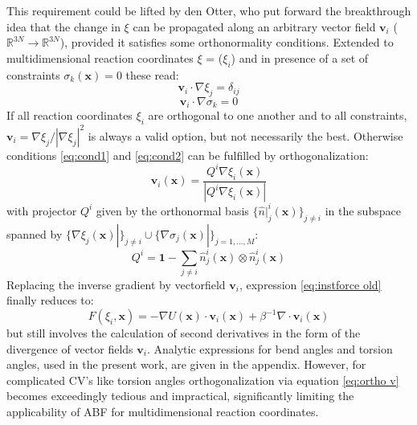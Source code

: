 This requirement could be lifted by den Otter\autocite{den2000thermodynamic}, who put forward the breakthrough idea that the change in $\xi$ can be propagated along an arbitrary vector field $\textbf{v}_i$ ($\mathbb{R}^{3N} \to \mathbb{R}^{3N}$), provided it satisfies some orthonormality conditions.
Extended to multidimensional reaction coordinates \textbf{$\xi$} = ($\xi_i$) and in presence of a set of constraints $\sigma_{k}(\textbf{x})=0$ these read:\autocite{ciccotti2005blue}
\begin{equation}
  \textbf{v}_i \cdot \nabla \xi_j = \delta_{ij} \label{eq:cond1}
\end{equation}
\begin{equation}
  \textbf{v}_i \cdot \nabla \sigma_k = 0 \label{eq:cond2}
\end{equation}
If all reaction coordinates $\xi_i$ are orthogonal to one another and to all constraints, $\textbf{v}_i = \nabla \xi_j/|\nabla \xi_j|^2$ is always a valid option, but not necessarily the best.
Otherwise conditions \ref{eq:cond1} and \ref{eq:cond2} can be fulfilled by orthogonalization:\autocite{ciccotti2005blue}
\begin{equation}
  \textbf{v}_i (\textbf{x}) = \frac{Q^i \nabla \xi_i (\textbf{x})}{|Q^i \nabla \xi_i (\textbf{x})|} \label{eq:ortho v}
\end{equation}
with projector $Q^i$ given by the orthonormal basis $\{\hat{n}|_{j}^{i}(\textbf{x})\}_{j\neq i}$ in the subspace spanned by $\{\nabla \xi_j (\textbf{x})|\}_{j\neq i} \cup \{\nabla\sigma_j (\textbf{x})|\}_{j=1,...,M}$:
\begin{equation}
  Q^i = \textbf{1} - \sum_{j \neq i} \hat{n}_{j}^{i}(\textbf{x}) \otimes \hat{n}_{j}^{i}(\textbf{x})
\end{equation}
Replacing the inverse gradient by vectorfield $\textbf{v}_i$, expression \ref{eq:instforce old} finally reduces to:
\begin{equation}
  F(\xi_i,\textbf{x}) = -\nabla U(\textbf{x}) \cdot \textbf{v}_i(\textbf{x}) + \beta^{-1} \nabla \cdot \textbf{v}_i(\textbf{x}) \label{eq:inst ABF force}
\end{equation}
but still involves the calculation of second derivatives in the form of the divergence of vector fields $\textbf{v}_i$.\autocite{comer2015adaptive} Analytic expressions for bend angles and torsion angles, used in the present work, are given in the appendix. However, for complicated CV's like torsion angles orthogonalization via equation \ref{eq:ortho v} becomes exceedingly tedious and impractical, significantly limiting the applicability of ABF for multidimensional reaction coordinates.

